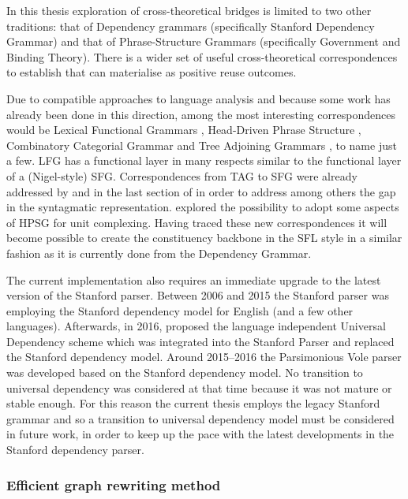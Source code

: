     In this thesis exploration of cross-theoretical bridges is limited to two other traditions: that of Dependency grammars (specifically Stanford Dependency Grammar) and that of Phrase-Structure Grammars (specifically Government and Binding Theory). There is a wider set of useful cross-theoretical correspondences to establish that can materialise as positive reuse outcomes. 
    
    Due to compatible approaches to language analysis and because some work has already been done in this direction, among the most interesting correspondences would be Lexical Functional Grammars \citep{bresnan2015lexical}, Head-Driven Phrase Structure \citep{PollardSag1994}, Combinatory Categorial Grammar \citep{Steedman93,Steedman2000} and Tree Adjoining Grammars \citep{KrochJoshi85}, to name just a few. LFG has a functional layer in many respects similar to the functional layer of a (Nigel-style) SFG. Correspondences from TAG to SFG were already addressed by \citet{Yang-etal91} and in the last section of \citet{Bateman2008} in order to address among others the gap in the syntagmatic representation. \citet{BatemanTeich91} explored the possibility to adopt some aspects of HPSG for unit complexing. Having traced these new correspondences it will become possible to create the constituency backbone in the SFL style in a similar fashion as it is currently done from the Dependency Grammar. 

    The current implementation also requires an immediate upgrade to the latest version of the Stanford parser. Between 2006 and 2015 the Stanford parser \citep{Marneffe2006} was employing the Stanford dependency model for English (and a few other languages). Afterwards, in 2016, \citet{Nivre2016ud} proposed the language independent Universal Dependency scheme which was integrated into the Stanford Parser and replaced the Stanford dependency model. Around 2015--2016 the Parsimonious Vole parser was developed based on the Stanford dependency model. No transition to universal dependency was considered at that time because it was not mature or stable enough. For this reason the current thesis employs the legacy Stanford grammar and so a transition to universal dependency model must be considered in future work, in order to keep up the pace with the latest developments in the Stanford dependency parser. 


\subsubsection{Efficient graph rewriting method}
    
